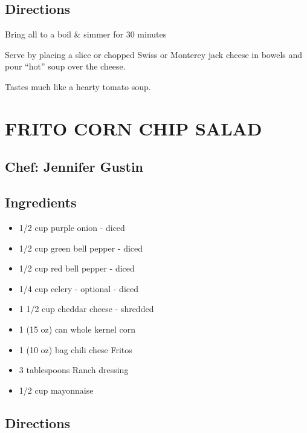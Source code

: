\documentclass[
]{book}
\providecommand{\tightlist}{%
  \setlength{\itemsep}{0pt}\setlength{\parskip}{0pt}}
\begin{document}
\hypertarget{directions-17}{%
\subsection*{Directions}\label{directions-17}}


Bring all to a boil \& simmer for 30 minutes

Serve by placing a slice or chopped Swiss or Monterey jack cheese in
bowels and pour ``hot'' soup over the cheese.

Tastes much like a hearty tomato soup.

\hypertarget{frito-corn-chip-salad}{%
\section*{FRITO CORN CHIP SALAD}\label{frito-corn-chip-salad}}


\hypertarget{chef-jennifer-gustin-4}{%
\subsection*{Chef: Jennifer Gustin}\label{chef-jennifer-gustin-4}}


\hypertarget{ingredients-18}{%
\subsection*{Ingredients}\label{ingredients-18}}


\begin{itemize}
\tightlist
\item
  1/2 cup purple onion - diced
\item
  1/2 cup green bell pepper - diced
\item
  1/2 cup red bell pepper - diced
\item
  1/4 cup celery - optional - diced
\item
  1 1/2 cup cheddar cheese - shredded
\item
  1 (15 oz) can whole kernel corn
\item
  1 (10 oz) bag chili chese Fritos
\item
  3 tablespoons Ranch dressing
\item
  1/2 cup mayonnaise
\end{itemize}

\hypertarget{directions-18}{%
\subsection*{Directions}\label{directions-18}}
\end{document}
